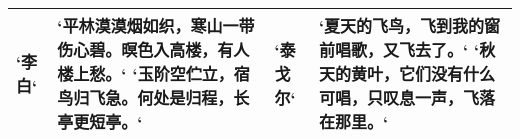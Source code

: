 \begin{table}[htbp]
\centering
\begin{tabularx}{350pt}{lXlX}
    \toprule
    `李白` & `平林漠漠烟如织，寒山一带伤心碧。暝色入高楼，有人楼上愁。`
    `玉阶空伫立，宿鸟归飞急。何处是归程，长亭更短亭。`& 
    `泰戈尔` & `夏天的飞鸟，飞到我的窗前唱歌，又飞去了。`
    `秋天的黄叶，它们没有什么可唱，只叹息一声，飞落在那里。`\\
    \bottomrule
\end{tabularx}
\end{table}

